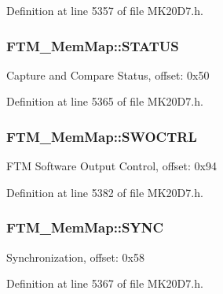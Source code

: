 Definition at line 5357 of file M\+K20\+D7.\+h.

\subsubsection[{\texorpdfstring{S\+T\+A\+T\+US}{STATUS}}]{ F\+T\+M\+\_\+\+Mem\+Map\+::\+S\+T\+A\+T\+US}\hypertarget{struct_f_t_m___mem_map_a9d49382f07b934530245cb8f578e117f}{}\label{struct_f_t_m___mem_map_a9d49382f07b934530245cb8f578e117f}
Capture and Compare Status, offset\+: 0x50 

Definition at line 5365 of file M\+K20\+D7.\+h.

\subsubsection[{\texorpdfstring{S\+W\+O\+C\+T\+RL}{SWOCTRL}}]{ F\+T\+M\+\_\+\+Mem\+Map\+::\+S\+W\+O\+C\+T\+RL}\hypertarget{struct_f_t_m___mem_map_afb4481ebbb2867c1bc009d6b73ad661e}{}\label{struct_f_t_m___mem_map_afb4481ebbb2867c1bc009d6b73ad661e}
F\+TM Software Output Control, offset\+: 0x94 

Definition at line 5382 of file M\+K20\+D7.\+h.

\subsubsection[{\texorpdfstring{S\+Y\+NC}{SYNC}}]{ F\+T\+M\+\_\+\+Mem\+Map\+::\+S\+Y\+NC}\hypertarget{struct_f_t_m___mem_map_a9537a55fae48de4811bfe7600d37b230}{}\label{struct_f_t_m___mem_map_a9537a55fae48de4811bfe7600d37b230}
Synchronization, offset\+: 0x58 

Definition at line 5367 of file M\+K20\+D7.\+h.

